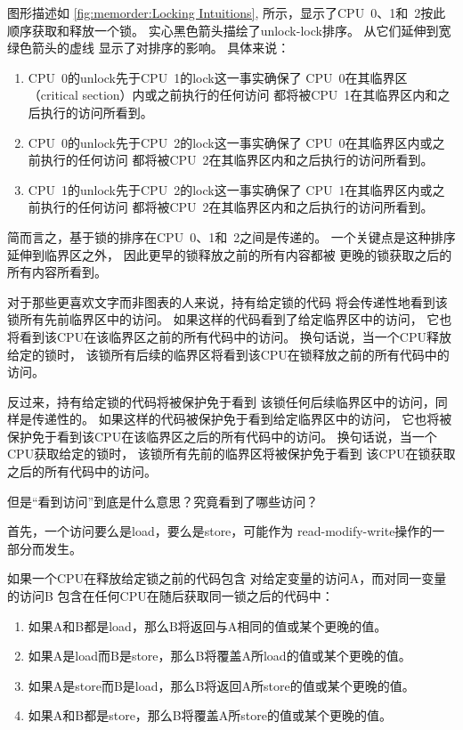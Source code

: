 图形描述如
\cref{fig:memorder:Locking Intuitions},
所示，显示了CPU~0、1和~2按此顺序获取和释放一个锁。
实心黑色箭头描绘了unlock-lock排序。
从它们延伸到宽绿色箭头的虚线
显示了对排序的影响。
具体来说：

\begin{enumerate}
\item	CPU~0的unlock先于CPU~1的lock这一事实确保了
	CPU~0在其临界区（critical section）内或之前执行的任何访问
	都将被CPU~1在其临界区内和之后执行的访问所看到。
\item	CPU~0的unlock先于CPU~2的lock这一事实确保了
	CPU~0在其临界区内或之前执行的任何访问
	都将被CPU~2在其临界区内和之后执行的访问所看到。
\item	CPU~1的unlock先于CPU~2的lock这一事实确保了
	CPU~1在其临界区内或之前执行的任何访问
	都将被CPU~2在其临界区内和之后执行的访问所看到。
\end{enumerate}

简而言之，基于锁的排序在CPU~0、1和~2之间是传递的。
一个关键点是这种排序延伸到临界区之外，
因此更早的锁释放之前的所有内容都被
更晚的锁获取之后的所有内容所看到。

对于那些更喜欢文字而非图表的人来说，持有给定锁的代码
将会传递性地看到该锁所有先前临界区中的访问。
如果这样的代码看到了给定临界区中的访问，
它也将看到该CPU在该临界区之前的所有代码中的访问。
换句话说，当一个CPU释放给定的锁时，
该锁所有后续的临界区将看到该CPU在锁释放之前的所有代码中的访问。

反过来，持有给定锁的代码将被保护免于看到
该锁任何后续临界区中的访问，同样是传递性的。
如果这样的代码被保护免于看到给定临界区中的访问，
它也将被保护免于看到该CPU在该临界区之后的所有代码中的访问。
换句话说，当一个CPU获取给定的锁时，
该锁所有先前的临界区将被保护免于看到
该CPU在锁获取之后的所有代码中的访问。

但是``看到访问''到底是什么意思？究竟看到了哪些访问？

首先，一个访问要么是load，要么是store，可能作为
read-modify-write操作的一部分而发生。

如果一个CPU在释放给定锁之前的代码包含
对给定变量的访问A，而对同一变量的访问B
包含在任何CPU在随后获取同一锁之后的代码中：

\begin{enumerate}
\item	如果A和B都是load，那么B将返回与A相同的值或某个更晚的值。
\item	如果A是load而B是store，那么B将覆盖A所load的值或某个更晚的值。
\item	如果A是store而B是load，那么B将返回A所store的值或某个更晚的值。
\item	如果A和B都是store，那么B将覆盖A所store的值或某个更晚的值。
\end{enumerate}

